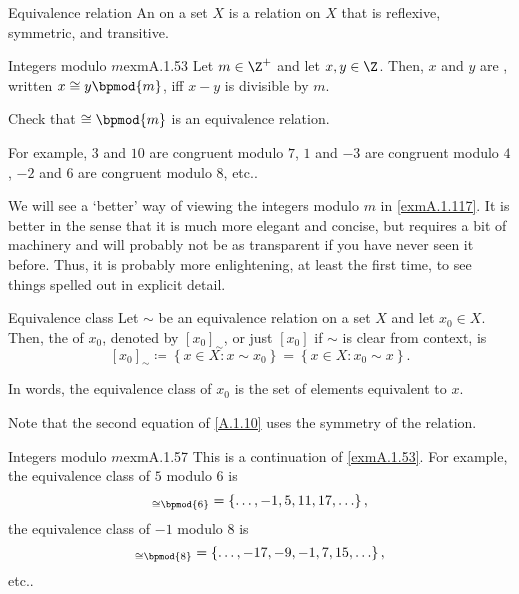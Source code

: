 \begin{dfn}{Equivalence relation}{}
An  on a set $X$ is a relation on $X$ that is reflexive, symmetric, and transitive.
\end{dfn}
\begin{exm}{Integers modulo $m$}{exmA.1.53}
Let $m\in \Z ^+$ and let $x,y\in \Z$.  Then, $x$ and $y$ are , written $x\cong y\bpmod{m}$, iff $x-y$ is divisible by $m$.
\begin{exr}{}{}
Check that $\cong \bpmod{m}$ is an equivalence relation.
\end{exr}
For example, $3$ and $10$ are congruent modulo $7$, $1$ and $-3$ are congruent modulo $4$, $-2$ and $6$ are congruent modulo $8$, etc..
\begin{rmk}
We will see a `better' way of viewing the integers modulo $m$ in \cref{exmA.1.117}.  It is better in the sense that it is much more elegant and concise, but requires a bit of machinery and will probably not be as transparent if you have never seen it before.  Thus, it is probably more enlightening, at least the first time, to see things spelled out in explicit detail.
\end{rmk}
\end{exm}
\begin{dfn}{Equivalence class}{}
Let $\sim$ be an equivalence relation on a set $X$ and let $x_0\in X$.  Then, the  of $x_0$, denoted by $[x_0]_\sim$\index[notation]{$[x_0]_\sim$}, or just $[x_0]$\index[notation]{$[x_0]$} if $\sim$ is clear from context, is
\begin{equation}\label{A.1.10}
[x_0]_\sim \coloneqq \left\{ x\in X:x\sim x_0\right\} =\left\{ x\in X:x_0\sim x\right\} .
\end{equation}
\begin{rmk}
In words, the equivalence class of $x_0$ is the set of elements equivalent to $x$.
\end{rmk}
\begin{rmk}
Note that the second equation of \eqref{A.1.10} uses the symmetry of the relation.
\end{rmk}
\end{dfn}
\begin{exm}{Integers modulo $m$}{exmA.1.57}
This is a continuation of \cref{exmA.1.53}.  For example, the equivalence class of $5$ modulo $6$ is
\begin{equation}
[5]_{\cong \bpmod{6}}=\left\{ \ldots ,-1,5,11,17,\ldots \right\} ,
\end{equation}
the equivalence class of $-1$ modulo $8$ is
\begin{equation}
[1]_{\cong \bpmod{8}}=\left\{ \ldots ,-17,-9,-1,7,15,\ldots \right\} ,
\end{equation}
etc..
\end{exm}
